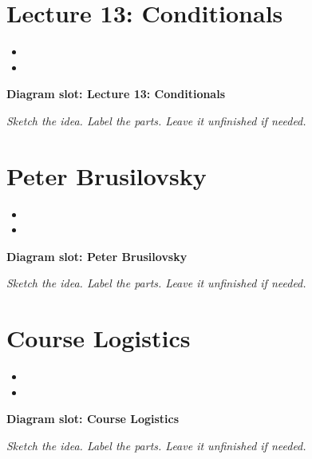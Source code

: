 \documentclass[14pt]{extarticle}
\begin{document}
\section{Lecture 13: Conditionals}
\begin{itemize}[leftmargin=*]
  \item \hrulefill
  \vspace{2.4em}
  \item \hrulefill
  \vspace{2.4em}
\end{itemize}
\noindent\textbf{Diagram slot: Lecture 13: Conditionals}
\begin{framed}
\begin{minipage}[t][0.22\textheight]{\textwidth}
\vspace{0.4em}
\textit{Sketch the idea. Label the parts. Leave it unfinished if needed.}
\end{minipage}
\end{framed}
\vspace{1em}
\section{Peter Brusilovsky}
\begin{itemize}[leftmargin=*]
  \item \hrulefill
  \vspace{2.4em}
  \item \hrulefill
  \vspace{2.4em}
\end{itemize}
\noindent\textbf{Diagram slot: Peter Brusilovsky}
\begin{framed}
\begin{minipage}[t][0.22\textheight]{\textwidth}
\vspace{0.4em}
\textit{Sketch the idea. Label the parts. Leave it unfinished if needed.}
\end{minipage}
\end{framed}
\vspace{1em}
\section{Course Logistics}
\begin{itemize}[leftmargin=*]
  \item \hrulefill
  \vspace{2.4em}
  \item \hrulefill
  \vspace{2.4em}
\end{itemize}
\noindent\textbf{Diagram slot: Course Logistics}
\begin{framed}
\begin{minipage}[t][0.22\textheight]{\textwidth}
\vspace{0.4em}
\textit{Sketch the idea. Label the parts. Leave it unfinished if needed.}
\end{minipage}
\end{framed}
\vspace{1em}
\end{document}
